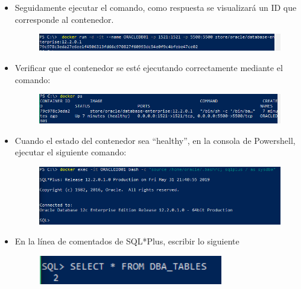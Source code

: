 \begin{itemize}
\begin{figure}[H]
\begin{center}
		\end{center}
		\end{figure}
	\item Seguidamente ejecutar el comando, como respuesta se visualizará un ID que corresponde al contenedor.
		\begin{figure}[H]
		\begin{center}
		\includegraphics[width=15cm]{./Imagenes/6}
		\end{center}
		\end{figure}
	\item Verificar que el contenedor se esté ejecutando correctamente mediante el comando:
		\begin{figure}[H]
		\begin{center}
		\includegraphics[width=15cm]{./Imagenes/7}
		\end{center}
		\end{figure}
	\item Cuando el estado del contenedor sea “healthy”, en la consola de Powershell, ejecutar el siguiente comando:
		\begin{figure}[H]
		\begin{center}
		\includegraphics[width=15cm]{./Imagenes/8}
		\end{center}
		\end{figure}
	\item En la línea de comentados de SQL*Plus, escribir lo siguiente
		\begin{figure}[H]
		\begin{center}
		\includegraphics[width=8cm]{./Imagenes/9}
		\end{center}

\end{figure}
\end{itemize}
